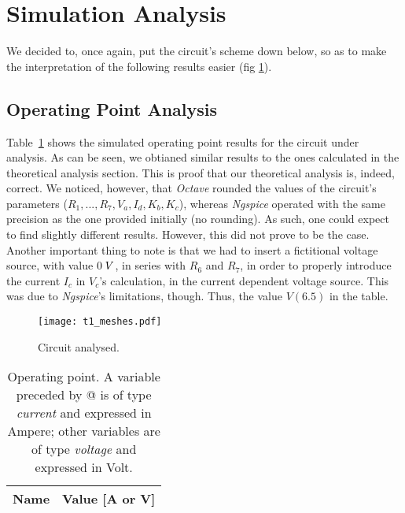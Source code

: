 \section{Simulation Analysis}
\label{sec:simulation}

We decided to, once again, put the circuit's scheme down below, so as to make the interpretation of the following results easier (fig \ref{fig:op}).

\subsection{Operating Point Analysis}

Table~\ref{tab:op} shows the simulated operating point results for the circuit
under analysis. As can be seen, we obtianed similar results to the ones calculated in the theoretical analysis section. This is proof that our theoretical analysis is, indeed, correct.
We noticed, however, that \emph{Octave} rounded the values of the circuit's parameters ($R_{1}, ..., R_{7}, V_{a}, I_{d}, K_{b}, K_{c}$), whereas \emph{Ngspice} operated with the same precision as the one provided initially (no rounding).
As such, one could expect to find slightly different results. However, this did not prove to be the case. Another important thing to note is that we had to insert a fictitional
voltage source, with value $0\hspace{1mm}V$, in series with $R_{6}$ and $R_{7}$, in order to properly introduce the current $I_{c}$ in $V_{c}$'s calculation, in the current dependent
voltage source. This was due to \emph{Ngspice}'s limitations, though. Thus,
the value $V(6.5)$ in the table.

\begin{figure}[h] \centering
  \texttt{[image: t1\_meshes.pdf]}
  \caption{Circuit analysed.}
  \label{fig:op}
\end{figure}

\begin{table}[h]
  \centering
  \begin{tabular}{|l|r|}
    \hline    
    {\bf Name} & {\bf Value [A or V]} \\ \hline
    
  \end{tabular}
  \caption{Operating point. A variable preceded by @ is of type {\em current}
    and expressed in Ampere; other variables are of type {\it voltage} and expressed in
    Volt.}
  \label{tab:op}
\end{table}
\newpage



